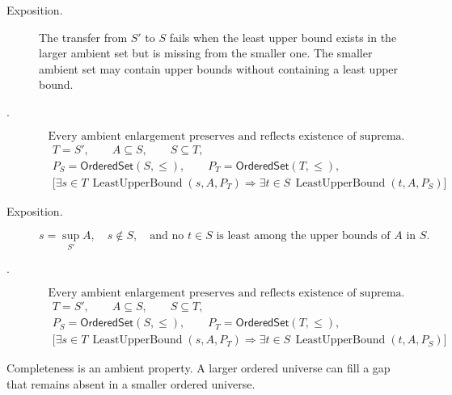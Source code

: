 \begin{remark*}
\begin{description}
  \item[Exposition.]
The transfer from $S'$ to $S$ fails when the least upper bound exists in the larger ambient set but is missing from the smaller one. The smaller ambient set may contain upper bounds without containing a least upper bound.


  \item[.]
  \[
\text{Every ambient enlargement preserves and reflects existence of suprema.}
\]
\[
\begin{aligned}
&T=S',\qquad A\subseteq S,\qquad S\subseteq T,\\
&P_S=\mathsf{OrderedSet}(S,\leq),\qquad
P_T=\mathsf{OrderedSet}(T,\leq),\\
&\bigl[\exists s\in T\,\operatorname{LeastUpperBound}(s,A,P_T)
\Longrightarrow
\exists t\in S\,\operatorname{LeastUpperBound}(t,A,P_S)\bigr]
\end{aligned}
\]
\end{description}
\end{remark*}

\begin{remark*}
\begin{description}
  \item[Exposition.]
\[
s=\sup_{S'} A,\quad s\notin S,\quad
\text{and no }t\in S\text{ is least among the upper bounds of }A\text{ in }S.
\]


  \item[.]
  \[
\text{Every ambient enlargement preserves and reflects existence of suprema.}
\]
\[
\begin{aligned}
&T=S',\qquad A\subseteq S,\qquad S\subseteq T,\\
&P_S=\mathsf{OrderedSet}(S,\leq),\qquad
P_T=\mathsf{OrderedSet}(T,\leq),\\
&\bigl[\exists s\in T\,\operatorname{LeastUpperBound}(s,A,P_T)
\Longrightarrow
\exists t\in S\,\operatorname{LeastUpperBound}(t,A,P_S)\bigr]
\end{aligned}
\]
\end{description}
\end{remark*}

\begin{remark*}[Interpretation]
Completeness is an ambient property. A larger ordered universe can fill a gap that remains absent in a smaller ordered universe.
\end{remark*}

